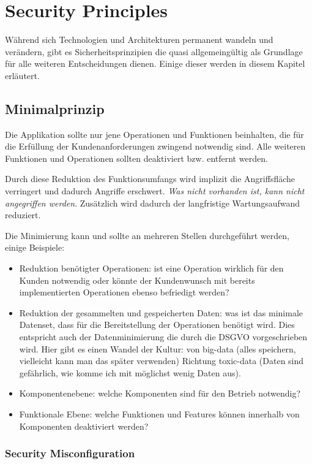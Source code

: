 \chapter{Security Principles}

Während sich Technologien und Architekturen permanent wandeln und verändern, gibt es Sicherheitsprinzipien die quasi allgemeingültig als Grundlage für alle weiteren Entscheidungen dienen. Einige dieser werden in diesem Kapitel erläutert.

\section{Minimalprinzip}

Die Applikation sollte nur jene Operationen und Funktionen beinhalten, die für die Erfüllung der Kundenanforderungen zwingend notwendig sind. Alle weiteren Funktionen und Operationen sollten deaktiviert bzw. entfernt werden.

Durch diese Reduktion des Funktionsumfangs wird implizit die Angriffsfläche verringert und dadurch Angriffe erschwert. \textit{Was nicht vorhanden ist, kann nicht angegriffen werden}. Zusätzlich wird dadurch der langfristige Wartungsaufwand reduziert.

Die Minimierung kann und sollte an mehreren Stellen durchgeführt werden, einige Beispiele:

\begin{itemize}
	\item Reduktion benötigter Operationen: ist eine Operation wirklich für den Kunden notwendig oder könnte der Kundenwunsch mit bereits implementierten Operationen ebenso befriedigt werden?
	\item Reduktion der gesammelten und gespeicherten Daten: was ist das minimale Datenset, dass für die Bereitstellung der Operationen benötigt wird. Dies entspricht auch der Datenminimierung die durch die DSGVO vorgeschrieben wird. Hier gibt es einen Wandel der Kultur: von big-data (alles speichern, vielleicht kann man das später verwenden) Richtung toxic-data (Daten sind gefährlich, wie komme ich mit möglichst wenig Daten aus).
	\item Komponentenebene: welche Komponenten sind für den Betrieb notwendig?
	\item Funktionale Ebene: welche Funktionen und Features können innerhalb von Komponenten deaktiviert werden?
\end{itemize}

\subsection{Security Misconfiguration}

